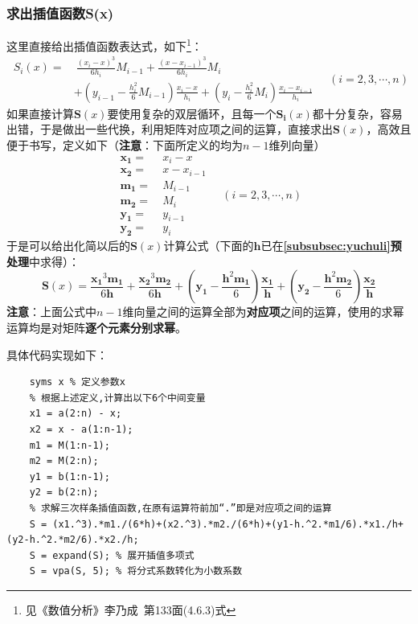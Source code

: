 \documentclass[12pt, a4paper, oneside]{ctexart}
\begin{document}
\subsubsection{求出插值函数S(x)}
这里直接给出插值函数表达式，如下\footnote{见《数值分析》李乃成\ 第133面(4.6.3)式}：
\begin{equation*}
    \begin{aligned}
        S_i(x) =&\ \frac{(x_i-x)^3}{6h_i}M_{i-1}+\frac{(x-x_{i-1})^3}{6h_i}M_i\\
        &+\left(y_{i-1}-\frac{h_i^2}{6}M_{i-1}\right)\frac{x_i-x}{h_i}+\left(y_i-\frac{h_i^2}{6}M_i\right)\frac{x_i-x_{i-1}}{h_i}
    \end{aligned}\quad (i=2,3,\cdots, n)
\end{equation*}
如果直接计算$\boldsymbol{S}(x)$要使用复杂的双层循环，且每一个$\boldsymbol{S_i}(x)$都十分复杂，容易出错，于是做出一些代换，利用矩阵对应项之间的运算，直接求出$\boldsymbol{S}(x)$，高效且便于书写，定义如下（\textbf{注意}：下面所定义的均为$n-1$维列向量）
\begin{equation*}
    \begin{aligned}
        \boldsymbol{x_1} =&\ x_i-x\\
        \boldsymbol{x_2} =&\ x-x_{i-1}\\
        \boldsymbol{m_1} =&\ M_{i-1}\\
        \boldsymbol{m_2} =&\ M_i\\
        \boldsymbol{y_1} =&\ y_{i-1}\\
        \boldsymbol{y_2} =&\ y_i
    \end{aligned}
    \quad (i=2,3,\cdots, n)
\end{equation*}
于是可以给出化简以后的$\boldsymbol{S}(x)$计算公式（下面的$\boldsymbol{h}$已在\textbf{\ref{subsubsec:yuchuli}}\textbf{预处理}中求得）：
\begin{equation*}
    \boldsymbol{S}(x) = \frac{\boldsymbol{x_1}^3\boldsymbol{m_1}}{6\boldsymbol{h}}+\frac{\boldsymbol{x_2}^3\boldsymbol{m_2}}{6\boldsymbol{h}}+\left(\boldsymbol{y_1}-\frac{\boldsymbol{h}^2\boldsymbol{m_1}}{6}\right)\frac{\boldsymbol{x_1}}{\boldsymbol{h}}+\left(\boldsymbol{y_2}-\frac{\boldsymbol{h}^2\boldsymbol{m_2}}{6}\right)\frac{\boldsymbol{x_2}}{\boldsymbol{h}}
\end{equation*}
\textbf{注意}：上面公式中$n-1$维向量之间的运算全部为\textbf{对应项}之间的运算，使用的求幂运算均是对矩阵\textbf{逐个元素分别求幂}。

具体代码实现如下：
\begin{lstlisting}
    syms x % 定义参数x
    % 根据上述定义,计算出以下6个中间变量
    x1 = a(2:n) - x;
    x2 = x - a(1:n-1);
    m1 = M(1:n-1);
    m2 = M(2:n);
    y1 = b(1:n-1);
    y2 = b(2:n);
    % 求解三次样条插值函数,在原有运算符前加“.”即是对应项之间的运算
    S = (x1.^3).*m1./(6*h)+(x2.^3).*m2./(6*h)+(y1-h.^2.*m1/6).*x1./h+(y2-h.^2.*m2/6).*x2./h;
    S = expand(S); % 展开插值多项式
    S = vpa(S, 5); % 将分式系数转化为小数系数
\end{lstlisting}
\newpage
\end{document}

